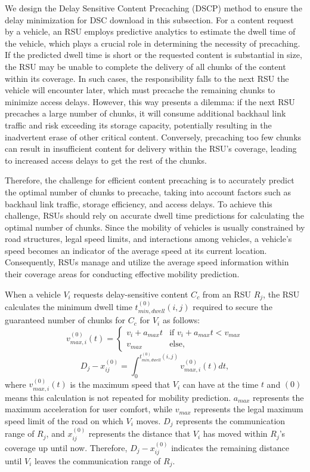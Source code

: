 \documentclass[journal]{IEEEtran}
\begin{document}
We design the Delay Sensitive Content Precaching (DSCP) method to ensure the delay minimization for DSC download in this subsection.
For a content request by a vehicle, an RSU employs predictive analytics to estimate the dwell time of the vehicle, which plays a crucial role in determining the necessity of precaching.
If the predicted dwell time is short or the requested content is substantial in size, the RSU may be unable to complete the delivery of all chunks of the content within its coverage.
In such cases, the responsibility falls to the next RSU the vehicle will encounter later, which must precache the remaining chunks to minimize access delays.
However, this way presents a dilemma: if the next RSU precaches a large number of chunks, it will consume additional backhaul link traffic and risk exceeding its storage capacity, potentially resulting in the inadvertent erase of other critical content.
Conversely, precaching too few chunks can result in insufficient content for delivery within the RSU's coverage, leading to increased access delays to get the rest of the chunks.

Therefore, the challenge for efficient content precaching is to accurately predict the optimal number of chunks to precache, taking into account factors such as backhaul link traffic, storage efficiency, and access delays.
To achieve this challenge, RSUs should rely on accurate dwell time predictions for calculating the optimal number of chunks.
Since the mobility of vehicles is usually constrained by road structures, legal speed limits, and interactions among vehicles, a vehicle's speed becomes an indicator of the average speed at its current location.
Consequently, RSUs manage and utilize the average speed information within their coverage areas for conducting effective mobility prediction.

When a vehicle $V_{i}$ requests delay-sensitive content $C_{c}$ from an RSU $R_{j}$, the RSU calculates the minimum dwell time $t^{(0)}_{min, dwell}(i,j)$ required to secure the guaranteed number of chunks for $C_{c}$ for $V_{i}$ as follows:
\begin{equation}
    v^{(0)}_{max, i}(t)=\begin{cases}
        v_{i}+a_{max}t & \text{if } v_{i}+a_{max}t < v_{max}\\
        v_{max} & \text{else},
    \end{cases}
\end{equation}
\begin{equation}
    D_{j}-x^{(0)}_{ij}=\int^{t^{(0)}_{min, dwell}(i,j)}_{0} v^{(0)}_{max, i}(t) dt,
\end{equation}
where $v^{(0)}_{max, i}(t)$ is the maximum speed that $V_{i}$ can have at the time $t$ and $(0)$ means this calculation is not repeated for mobility prediction.
$a_{max}$ represents the maximum acceleration for user comfort, while $v_{max}$ represents the legal maximum speed limit of the road on which $V_{i}$ moves.
$D_{j}$ represents the communication range of $R_{j}$, and $x^{(0)}_{ij}$ represents the distance that $V_{i}$ has moved within $R_{j}$'s coverage up until now.
Therefore, $D_{j}-x^{(0)}_{ij}$ indicates the remaining distance until $V_{i}$ leaves the communication range of $R_{j}$.
\end{document}
